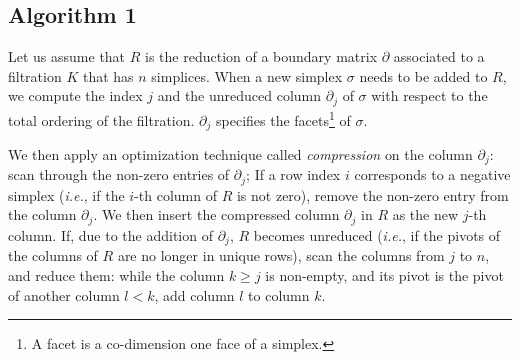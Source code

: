 \documentclass[11pt]{article}
\begin{document}
\subsection{Algorithm 1}

Let us assume that $R$ is the reduction of a boundary matrix $\partial$ associated to a filtration 
$K$ that has $n$ simplices.  When a new simplex $\sigma$ needs to be added to $R$, we compute the 
index $j$ and the unreduced column $\partial_j$ of $\sigma$ with respect to the total ordering of 
the filtration.  $\partial_j$ specifies the facets\footnote{A facet is a co-dimension one face of a 
simplex.} of $\sigma$.

We then apply an optimization technique called \emph{compression} \cite{kerber-18} on the column 
$\partial_j$: scan through the non-zero entries of $\partial_j$; If a row index $i$ corresponds to 
a negative simplex (\emph{i.e.}, if the $i$-th column of $R$ is not zero), remove the non-zero entry
from the column $\partial_j$.  We then insert the compressed column $\partial_j$ in $R$ as the new 
$j$-th column.  If, due to the addition of $\partial_j$, $R$ becomes unreduced (\emph{i.e.}, if the 
pivots of the columns of $R$ are no longer in unique rows), scan the columns from $j$ to $n$, and 
reduce them: while the column $k \geq j$ is non-empty, and its pivot is the pivot of another column 
$l < k$, add column $l$ to column $k$.




\end{document}
